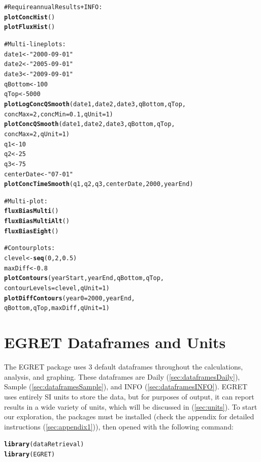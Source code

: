 \documentclass[a4paper,11pt]{article}\usepackage{graphicx, color}
\makeatletter
\newcommand{\hlfunctioncall}[1]{\textcolor[rgb]{0.501960784313725,0,0.329411764705882}{\textbf{#1}}}%
\newcommand{\hlstring}[1]{\textcolor[rgb]{0.6,0.6,1}{#1}}%
\newcommand{\hlcomment}[1]{\textcolor[rgb]{0.180392156862745,0.6,0.341176470588235}{#1}}%
\newenvironment{kframe}{%
 \def\at@end@of@kframe{}%
 \ifinner\ifhmode%
  \def\at@end@of@kframe{\end{minipage}}%
  \begin{minipage}{\columnwidth}%
 \fi\fi%
 \def\FrameCommand##1{\hskip\@totalleftmargin \hskip-\fboxsep
 \colorbox{shadecolor}{##1}\hskip-\fboxsep
     \hskip-\linewidth \hskip-\@totalleftmargin \hskip\columnwidth}%
 \MakeFramed {\advance\hsize-\width
   \@totalleftmargin\z@ \linewidth\hsize
   \@setminipage}}%
 {\par\unskip\endMakeFramed%
 \at@end@of@kframe}
\newenvironment{knitrout}{}{} %
\makeatother
\begin{document}
\begin{knitrout}
\begin{kframe}
\begin{alltt}
\hlcomment{#Require annualResults + INFO:}
\hlfunctioncall{plotConcHist}()
\hlfunctioncall{plotFluxHist}()

\hlcomment{# Multi-line plots:}
date1 <- \hlstring{"2000-09-01"}
date2 <- \hlstring{"2005-09-01"}
date3 <- \hlstring{"2009-09-01"}
qBottom<-100
qTop<-5000
\hlfunctioncall{plotLogConcQSmooth}(date1, date2, date3, qBottom, qTop, 
                   concMax=2, concMin=0.1,qUnit=1)
\hlfunctioncall{plotConcQSmooth}(date1, date2, date3, qBottom, qTop, 
                   concMax=2,qUnit=1)
q1 <- 10
q2 <- 25
q3 <- 75
centerDate <- \hlstring{"07-01"}
\hlfunctioncall{plotConcTimeSmooth}(q1, q2, q3, centerDate, 2000, yearEnd)

\hlcomment{# Multi-plot:}
\hlfunctioncall{fluxBiasMulti}()
\hlfunctioncall{fluxBiasMultiAlt}()
\hlfunctioncall{fluxBiasEight}()

\hlcomment{#Contour plots:}
clevel<-\hlfunctioncall{seq}(0,2,0.5)
maxDiff<-0.8
\hlfunctioncall{plotContours}(yearStart,yearEnd,qBottom,qTop, 
             contourLevels = clevel,qUnit=1)
\hlfunctioncall{plotDiffContours}(year0=2000,yearEnd,
                 qBottom,qTop,maxDiff,qUnit=1)

\end{alltt}
\end{kframe}
\end{knitrout}



\section{EGRET Dataframes and Units}
\label{sec:dataframes}
The EGRET package uses 3 default dataframes throughout the calculations, analysis, and graphing. These dataframes are Daily (\ref{sec:dataframesDaily}), Sample (\ref{sec:dataframesSample}), and INFO (\ref{sec:dataframesINFO}). EGRET uses entirely SI units to store the data, but for purposes of output, it can report results in a wide variety of units, which will be discussed in (\ref{sec:units}). To start our exploration, the packages must be installed (check the appendix for detailed instructions (\ref{sec:appendix1})), then opened with the following command:

\begin{knitrout}
\color{fgcolor}\begin{kframe}
\begin{alltt}
\hlfunctioncall{library}(dataRetrieval)
\hlfunctioncall{library}(EGRET)
\end{alltt}
\end{kframe}
\end{knitrout}
\end{document}
